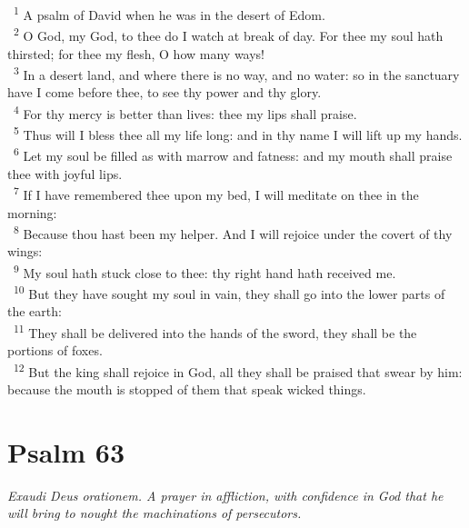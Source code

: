 \documentclass[a5paper,12pt]{article}
\begin{document}
\begin{multicols*}{2}
~\textsuperscript{1} A psalm of David when he was in the desert of Edom.\\
~\textsuperscript{2} O God, my God, to thee do I watch at break of day. For thee my soul hath thirsted; for thee my flesh, O how many ways!\\
~\textsuperscript{3} In a desert land, and where there is no way, and no water: so in the sanctuary have I come before thee, to see thy power and thy glory.\\
~\textsuperscript{4} For thy mercy is better than lives: thee my lips shall praise.\\
~\textsuperscript{5} Thus will I bless thee all my life long: and in thy name I will lift up my hands.\\
~\textsuperscript{6} Let my soul be filled as with marrow and fatness: and my mouth shall praise thee with joyful lips.\\
~\textsuperscript{7} If I have remembered thee upon my bed, I will meditate on thee in the morning:\\
~\textsuperscript{8} Because thou hast been my helper. And I will rejoice under the covert of thy wings:\\
~\textsuperscript{9} My soul hath stuck close to thee: thy right hand hath received me.\\
~\textsuperscript{10} But they have sought my soul in vain, they shall go into the lower parts of the earth:\\
~\textsuperscript{11} They shall be delivered into the hands of the sword, they shall be the portions of foxes.\\
~\textsuperscript{12} But the king shall rejoice in God, all they shall be praised that swear by him: because the mouth is stopped of them that speak wicked things.\\

\section{Psalm 63}
\label{sec:orgffa548b}
\emph{Exaudi Deus orationem. A prayer in affliction, with confidence in God that he will bring to nought the machinations of persecutors.}\\


\end{multicols*}
\end{document}
